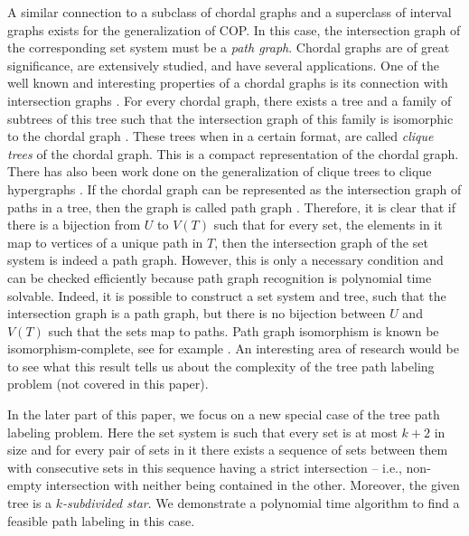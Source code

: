 \documentclass[MS]             %
              {iitmdiss_as}    %
\begin{document}
{}  A similar connection to a subclass of chordal graphs and a
superclass of interval graphs exists for the generalization of COP.
In this case, the intersection graph of the corresponding set system
must be a {\em path graph}. Chordal graphs are of great significance,
are extensively studied, and have several applications.  One of the well
known and interesting properties of a chordal graphs is its connection
with intersection graphs \cite{mcg04}. For every chordal graph, there
exists a tree and a family of subtrees of this tree such that the
intersection graph of this family is isomorphic to the chordal graph
\cite{plr70,gav78,bp93}.  These trees when in a certain format, are
called {\em clique trees} \cite{apy92} of the chordal graph. This is a
compact representation of the chordal graph. There has also been work
done on the generalization of clique trees to clique hypergraphs
\cite{km02}.  If the chordal graph can be represented as the
intersection graph of paths in a tree, then the graph is called path
graph \cite{mcg04}.  Therefore, it is clear that if there is a
bijection from $U$ to $V(T)$ such that for every set, the elements in
it map to vertices of a unique path in $T$, then the intersection
graph of the set system is indeed a path graph.  However, this is only
a necessary condition and can be checked efficiently because path
graph recognition is polynomial time
solvable\cite{gav78,aas93}. Indeed, it is possible to construct a set
system and tree, such that the intersection graph is a path graph, but
there is no bijection between $U$ and $V(T)$ such that the sets map to
paths. Path graph isomorphism is known be isomorphism-complete, see
for example \cite{kklv10}. An interesting area of research would be to
see what this result tells us about the complexity of the tree path
labeling problem (not covered in this paper).

In the later part of this paper, we focus on a new special case of the
tree path labeling problem. Here the set system is such that every set
is at most $k+2$ in size and for every pair of sets in it there exists
a sequence of sets between them with consecutive sets in this sequence
having a strict intersection -- i.e., non-empty intersection with
neither being contained in the other. Moreover, the given tree is a
{\em $k$-subdivided star}. We demonstrate a polynomial time algorithm
to find a feasible path labeling in this case.
\end{document}
